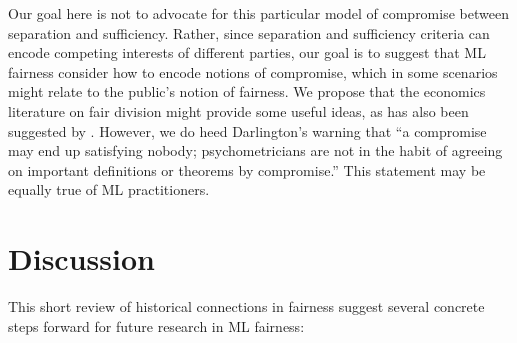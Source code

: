 \documentclass[sigconf,letterpaper,9pt]{acmart}
\begin{document}
Our goal here is not to advocate for this particular model of compromise
between separation and sufficiency. Rather, since separation and sufficiency criteria can encode competing interests of different parties, our goal is to suggest that ML fairness
consider how to encode notions of compromise, which in some scenarios
might relate to the public's notion of fairness. We propose
that the economics literature on fair division might provide some useful ideas,
as has also been suggested by \cite{zafar2017parity}.
However, we do heed Darlington's \cite{darlington1971another}
warning that ``a compromise may end up satisfying nobody; psychometricians are not in the habit of agreeing on important definitions or theorems by compromise.'' This statement may be equally true of ML practitioners.

\section{Discussion}

This short review of historical connections in fairness suggest several concrete steps forward for future research in ML fairness:
\end{document}
